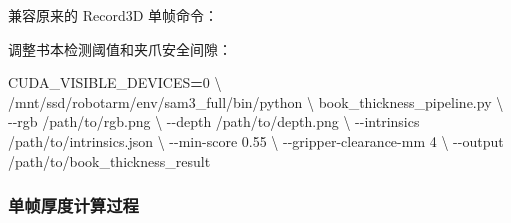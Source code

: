 \documentclass[
  chinese,
  11pt,
  a4paper,
]{article}
\newenvironment{Shaded}{\begin{snugshade}}{\end{snugshade}}
\newcommand{\AttributeTok}[1]{\textcolor[rgb]{0.13,0.29,0.53}{#1}}
\newcommand{\BuiltInTok}[1]{#1}
\newcommand{\DataTypeTok}[1]{\textcolor[rgb]{0.13,0.29,0.53}{#1}}
\newcommand{\ExtensionTok}[1]{#1}
\newcommand{\NormalTok}[1]{#1}
\newcommand{\OperatorTok}[1]{\textcolor[rgb]{0.81,0.36,0.00}{\textbf{#1}}}
\newcommand{\StringTok}[1]{\textcolor[rgb]{0.31,0.60,0.02}{#1}}
\newcommand{\VariableTok}[1]{\textcolor[rgb]{0.00,0.00,0.00}{#1}}
\begin{document}
兼容原来的 Record3D 单帧命令：

\begin{Shaded}
\end{Shaded}

调整书本检测阈值和夹爪安全间隙：

\begin{Shaded}
\begin{Highlighting}[]
\VariableTok{CUDA\_VISIBLE\_DEVICES}\OperatorTok{=}\NormalTok{0 }\DataTypeTok{\textbackslash{}}
\ExtensionTok{/mnt/ssd/robotarm/env/sam3\_full/bin/python} \DataTypeTok{\textbackslash{}}
\NormalTok{book\_thickness\_pipeline.py }\DataTypeTok{\textbackslash{}}
  \AttributeTok{{-}{-}rgb}\NormalTok{ /path/to/rgb.png }\DataTypeTok{\textbackslash{}}
  \AttributeTok{{-}{-}depth}\NormalTok{ /path/to/depth.png }\DataTypeTok{\textbackslash{}}
  \AttributeTok{{-}{-}intrinsics}\NormalTok{ /path/to/intrinsics.json }\DataTypeTok{\textbackslash{}}
  \AttributeTok{{-}{-}min{-}score}\NormalTok{ 0.55 }\DataTypeTok{\textbackslash{}}
  \AttributeTok{{-}{-}gripper{-}clearance{-}mm}\NormalTok{ 4 }\DataTypeTok{\textbackslash{}}
  \AttributeTok{{-}{-}output}\NormalTok{ /path/to/book\_thickness\_result}
\end{Highlighting}
\end{Shaded}

\subsubsection{单帧厚度计算过程}\label{ux5355ux5e27ux539aux5ea6ux8ba1ux7b97ux8fc7ux7a0b}
\end{document}
